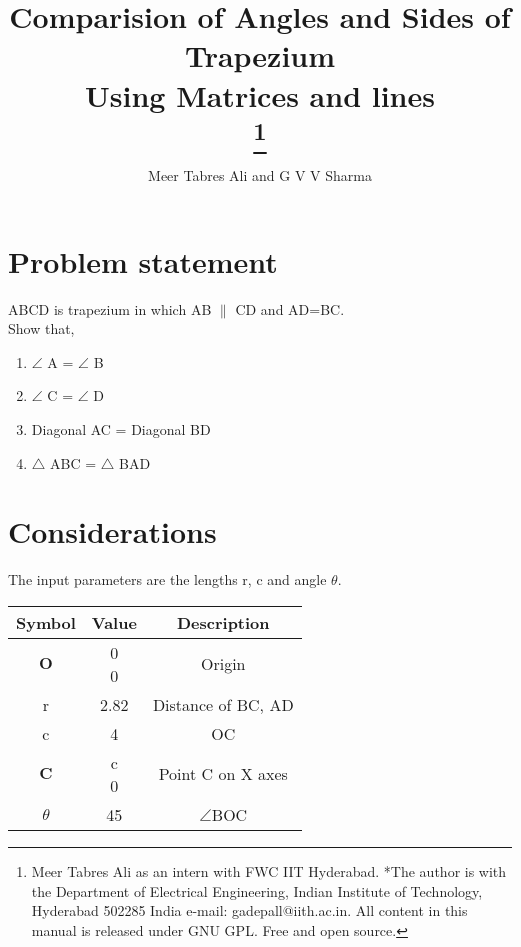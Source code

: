 \documentclass[journal,10pt,twocolumn]{article}
\begin{document}

\let\vec\mathbf




\title{
{Comparision of Angles and Sides of Trapezium\\
Using Matrices and lines}\\

\thanks{Meer Tabres Ali as an intern with FWC IIT Hyderabad. *The author is with the Department of Electrical Engineering, Indian Institute of Technology, Hyderabad 502285 India e-mail: gadepall@iith.ac.in. All content in this manual is released under GNU GPL. Free and open source.}
}
\author{Meer Tabres Ali and G V V Sharma}
\maketitle
\tableofcontents
\section{Problem statement}
ABCD is trapezium in which AB $\parallel$ CD and AD=BC.\\
Show that, \\
\begin{enumerate}
    \item $\angle$ A = $\angle$ B\\
    \item $\angle$ C = $\angle$ D\\
    \item Diagonal AC = Diagonal BD\\
    \item $\triangle$ ABC  = $\triangle$ BAD \\
\end{enumerate}

\section{Considerations}
\vspace{0.2cm}
The input parameters are the lengths r, c and angle $\theta$. \\
\vspace{0.2cm}
{


\setlength\extrarowheight{2pt}
\begin{tabular}{|c|c|c|}
	\hline
	\textbf{Symbol}&\textbf{Value}&\textbf{Description}\\
	\hline
	$\vec{O}$ & \myvec{0\\0}
	&Origin\\
	\hline
	r&2.82& Distance of BC, AD\\
	\hline
	c&4&OC\\
	
	\hline
	$\vec{C}$ & \myvec{c \\ 0}

	&Point C on X axes
	\\
\hline
	$\theta$&45 \textdegree &$\angle$BOC\\
	\hline
\end{tabular}
}
\end{document}
